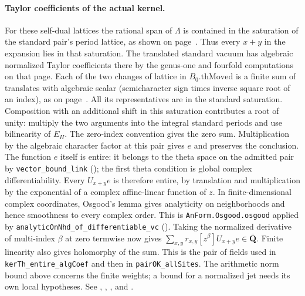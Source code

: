 \paragraph{Taylor coefficients of the actual kernel.}\label{r14:kernel-jets}
For these self-dual lattices the rational span of $\Lambda$ is
contained in the saturation of the standard pair's period lattice,
as shown on page~\pageref{r8:Z4.2.04}. Thus every $x+y$ in the expansion
lies in that saturation. The translated standard vacuum has algebraic
normalized Taylor coefficients there by the genus-one and fourfold
computations on that page. Each of the two changes of lattice in
$B_0.\mathrm{thMoved}$ is a finite sum of translates with algebraic
scalar (semicharacter sign times inverse square root of an index),
as on page~\pageref{r7:Z4.2.04}. All its representatives are in the
standard saturation. Composition with an additional shift in this
saturation contributes a root of unity: multiply the two arguments into
the integral standard periods and use bilinearity of $E_H$.
The zero-index convention gives the zero sum. Multiplication by the
algebraic character factor at this pair gives $e$ and preserves the
conclusion. The function $e$ itself is entire: it belongs to the theta
space on the admitted pair by \nolinkurl{vector_bound_link}
();
the first theta condition is global complex differentiability.
Every $U_{x+y}e$ is therefore entire, by translation and multiplication
by the exponential of a complex affine-linear function of $z$.
In finite-dimensional complex coordinates, Osgood's lemma gives
analyticity on neighborhoods and hence smoothness to every complex
order. This is \nolinkurl{AnForm.Osgood.osgood} applied by
\nolinkurl{analyticOnNhd_of_differentiable_vc}
().
Taking the normalized derivative of multi-index $\beta$ at zero termwise
now gives $\sum_{x,y}r_{x,y}[z^\beta]U_{x+y}e\in\overline{\mathbf Q}$.
Finite linearity also gives holomorphy of the sum. This is the pair of
fields used in \nolinkurl{kerTh_entire_algCoef} and then in
\nolinkurl{pairOK_allSites}. The arithmetic norm bound above concerns the
finite weights; a bound for a normalized jet needs its own local
hypotheses. See ,
,
,
 and
.

